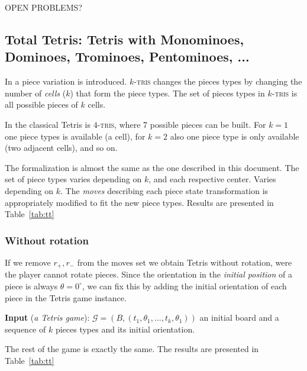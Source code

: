 OPEN PROBLEMS?

\subsection{Total Tetris: Tetris with Monominoes, Dominoes, Trominoes, Pentominoes, ...}

In \cite{TT} a piece variation is introduced. $k$-\textsc{tris} changes the pieces types by changing the number of \emph{cells} ($k$) that form the piece types. The  set of pieces types in $k$-\textsc{tris} is all possible pieces of $k$ cells.

In the classical Tetris is $4$-\textsc{tris}, where 7 possible pieces can be built. For $k = 1$ one piece types is available (a cell), for $k=2$ also one piece type is only available (two adjacent cells), and so on. 

The formalization is almost the same as the one described in this document. The set of piece types varies depending on $k$, and each respective center. Varies depending on $k$. The \emph{moves} describing each piece state transformation is appropriately modified to fit the new piece types. Results are presented in Table~\ref{tab:tt} 


\subsubsection{Without rotation}

If we remove $r_+, r_-$ from the moves set we obtain Tetris without rotation, were the player cannot rotate pieces. Since the orientation in the \emph{initial position} of a piece is always $\theta = 0^\circ$, we can fix this by adding the initial orientation of each piece in the Tetris game instance.

\textbf{Input} (\textit{a Tetris game}): $\mathcal{G} = (B,(t_1,\theta_1, \dots,t_k,\theta_1))$ an initial board and a sequence of $k$ pieces types and its initial orientation.


The rest of the game is exactly the same. The results are presented in Table~\ref{tab:tt} 

